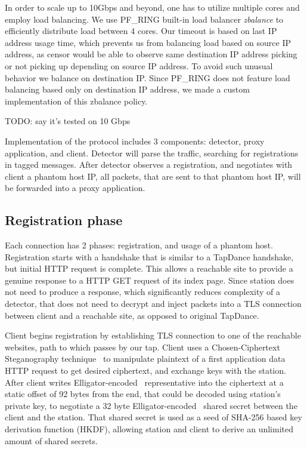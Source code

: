 \documentclass[letterpaper,twocolumn,10pt]{article}
\begin{document}
In order to scale up to 10Gbps and beyond,
one has to utilize multiple cores and employ load balancing.
We use PF\_RING built-in load balancer \emph{zbalance} to efficiently
distribute load between 4 cores.
Our timeout is based on last IP address usage time, which prevents us from
balancing load based on source IP address,
as censor would be able to observe
same destination IP address picking or not picking up
depending on source IP address.
To avoid such unusual behavior we balance on destination IP.
Since PF\_RING does not feature load balancing based only on destination
IP address, we made a custom implementation of this zbalance policy.

TODO: say it's tested on 10 Gbps

Implementation of the protocol includes 3 components:
detector, proxy application, and client.
Detector will parse the traffic, searching for registrations in
tagged messages. After detector observes a registration, and negotiates with client
a phantom host IP,
all packets, that are sent to that phantom host IP,
will be forwarded into a proxy application.

\subsection{Registration phase}

Each \scheme connection has 2 phases: registration, and usage of a phantom host.
Registration starts with a handshake that is similar to a TapDance handshake,
but initial HTTP request is complete.
This allows a reachable site to provide a genuine response
to a HTTP GET request of its index page.
Since station does not need to produce a response,
which significantly reduces complexity of a detector,
that does not need to decrypt and inject packets into a TLS connection between
client and a reachable site, as opposed to original TapDance.

Client begins registration by establishing TLS connection
to one of the reachable websites,
path to which passes by our tap.
Client uses a Chosen-Ciphertext Steganography technique~\cite{tapdance14} to manipulate
plaintext of a first application data HTTP request
to get desired ciphertext,
and exchange keys with the station.
After client writes Elligator-encoded~\cite{elligator} representative into the ciphertext at a static offset of 92 bytes from the end,
that could be decoded using station's private key,
to negotiate a 32 byte Elligator-encoded~\cite{elligator} shared secret between the client and the station.
That shared secret is used as a seed of SHA-256 based key derivation function (HKDF),
allowing station and client to derive an unlimited amount of shared secrets.
\end{document}

